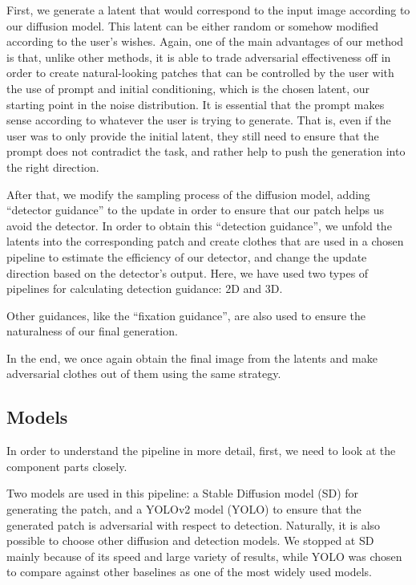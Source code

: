 First, we generate a latent that would correspond to the input image according to our diffusion model.
This latent can be either random or somehow modified according to the user's wishes. 
Again, one of the main advantages of our method is that, unlike other methods, it is able to trade adversarial effectiveness off in order to create natural-looking patches that can be controlled by the user with the use of prompt and initial conditioning, which is the chosen latent, our starting point in the noise distribution.
It is essential that the prompt makes sense according to whatever the user is trying to generate.
That is, even if the user was to only provide the initial latent, they still need to ensure that the prompt does not contradict the task, and rather help to push the generation into the right direction.

After that, we modify the sampling process of the diffusion model, adding ``detector guidance'' to the update in order to ensure that our patch helps us avoid the detector.
In order to obtain this ``detection guidance'', we unfold the latents into the corresponding patch and create clothes that are used in a chosen pipeline to estimate the efficiency of our detector, and change the update direction based on the detector's output.
Here, we have used two types of pipelines for calculating detection guidance: 2D and 3D.

Other guidances, like the ``fixation guidance'', are also used to ensure the naturalness of our final generation.

In the end, we once again obtain the final image from the latents and make adversarial clothes out of them using the same strategy.

\subsection{Models}

In order to understand the pipeline in more detail, first, we need to look at the component parts closely.

Two models are used in this pipeline: a Stable Diffusion model (SD) for generating the patch, and a YOLOv2 model (YOLO) to ensure that the generated patch is adversarial with respect to detection.
Naturally, it is also possible to choose other diffusion and detection models.
We stopped at SD mainly because of its speed and large variety of results, while YOLO was chosen to compare against other baselines as one of the most widely used models.

